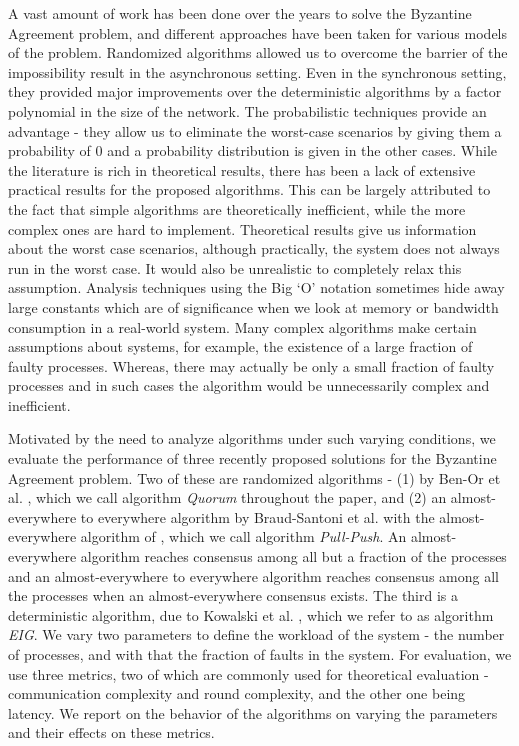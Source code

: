 A vast amount of work has been done over the years to solve the Byzantine Agreement problem, and different approaches have been taken for various models of the problem. Randomized algorithms allowed us to overcome the barrier of the impossibility result in the asynchronous setting. Even in the synchronous setting, they provided major improvements over the deterministic algorithms by a factor polynomial in the size of the network. The probabilistic techniques provide an advantage - they allow us to eliminate the worst-case scenarios by giving them a probability of $0$ and a probability distribution is given in the other cases. While the literature is rich in theoretical results, there has been a lack of extensive practical results for the proposed algorithms. This can be largely attributed to the fact that simple algorithms are theoretically inefficient, while the more complex ones are hard to implement. Theoretical results give us information about the worst case scenarios, although practically, the system does not always run in the worst case. It would also be unrealistic to completely relax this assumption. Analysis techniques using the Big `O' notation sometimes hide away large constants which are of significance when we look at memory or bandwidth consumption in a real-world system. Many complex algorithms make certain assumptions about systems, for example, the existence of a large fraction of faulty processes. Whereas, there may actually be only a small fraction of faulty processes and in such cases the algorithm would be unnecessarily complex and inefficient.

Motivated by the need to analyze algorithms under such varying conditions, we evaluate the performance of three recently proposed solutions for the Byzantine Agreement problem. Two of these are randomized algorithms - (1) by Ben-Or et al. \cite{BPV06}, which we call algorithm \textit{Quorum} throughout the paper, and (2) an almost-everywhere to everywhere algorithm by Braud-Santoni et al. \cite{BGH13} with the almost-everywhere algorithm of \cite{KSSV06}, which we call algorithm \textit{Pull-Push}. An almost-everywhere algorithm reaches consensus among all but a fraction of the processes and an almost-everywhere to everywhere algorithm reaches consensus among all the processes when an almost-everywhere consensus exists. The third is a deterministic algorithm, due to Kowalski et al. \cite{KM13}, which we refer to as algorithm \textit{EIG}. We vary two parameters to define the workload of the system - the number of processes, and with that the fraction of faults in the system. For evaluation, we use three metrics, two of which are commonly used for theoretical evaluation - communication complexity and round complexity, and the other one being latency. We report on the behavior of the algorithms on varying the parameters and their effects on these metrics. 

